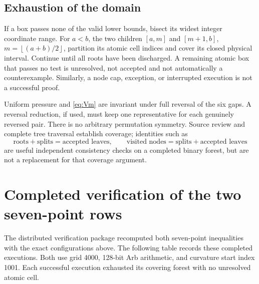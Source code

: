\documentclass[11pt]{amsart}
\numberwithin{equation}{section}
\newcommand{\floor}[1]{\left\lfloor #1\right\rfloor}
\begin{document}
\subsection{Exhaustion of the domain}

If a box passes none of the valid lower bounds, bisect its widest
integer coordinate range. For $a<b$, the two children $[a,m]$ and
$[m+1,b]$, $m=\floor{(a+b)/2}$, partition its atomic cell indices
and cover its closed physical interval. Continue until all roots have
been discharged. A remaining atomic box that passes no test is
unresolved, not accepted and not automatically a counterexample.
Similarly, a node cap, exception, or interrupted execution is not a
successful proof.

Uniform pressure and \eqref{eq:Vm} are invariant under full reversal
of the six gaps. A reversal reduction, if used, must keep one
representative for each genuinely reversed pair. There is no
arbitrary permutation symmetry. Source review and complete tree
traversal establish coverage; identities such as
\begin{equation}\label{eq:treecounts}
 \text{roots}+\text{splits}=\text{accepted leaves},\qquad
 \text{visited nodes}=\text{splits}+\text{accepted leaves}
\end{equation}
are useful independent consistency checks on a completed binary forest,
but are not a replacement for that coverage argument.

\section{Completed verification of the two seven-point rows}

The distributed verification package recomputed both seven-point
inequalities with the exact configurations above. The following table
records these completed executions. Both use grid 4000, 128-bit Arb
arithmetic, and curvature start index 1001. Each successful execution
exhausted its covering forest with no unresolved atomic cell.
\end{document}
